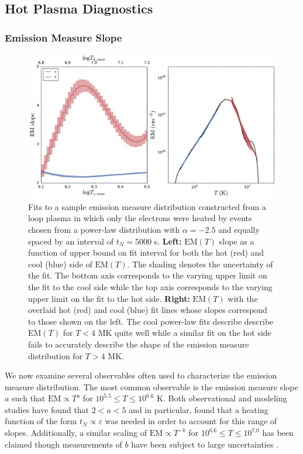 \documentclass[apj]{emulateapj}
\begin{document}
	\subsection{Hot Plasma Diagnostics}
	\label{subsec:diagnostics}
	\subsubsection{Emission Measure Slope}
	\label{subsubsec:em_slope}
	\begin{figure}
		\centering
		\includegraphics[width=2\columnwidth]{figures/em_slope_varying_bounds.pdf}
		\caption{Fits to a sample emission measure distribution constructed from a loop plasma in which only the electrons were heated by events chosen from a power-law distribution with $\alpha=-2.5$ and equally spaced by an interval of $t_N=5000$ s. \textbf{Left:} $\mathrm{EM}(T)$ slope as a function of upper bound on fit interval for both the hot (red) and cool (blue) side of $\mathrm{EM}(T)$. The shading denotes the uncertainty of the fit. The bottom axis corresponds to the varying upper limit on the fit to the cool side while the top axis corresponds to the varying upper limit on the fit to the hot side. \textbf{Right:} $\mathrm{EM}(T)$ with the overlaid hot (red) and cool (blue) fit lines whose slopes correspond to those shown on the left. The cool power-law fits describe describe $\mathrm{EM}(T)$ for $T<4$ MK quite well while a similar fit on the hot side fails to accurately describe the shape of the emission measure distribution for $T>4$ MK.}
		\label{fig:em_slope_varying_bounds}
	\end{figure}
	\par We now examine several observables often used to characterize the emission measure distribution. The most common observable is the emission measure slope $a$ such that $\mathrm{EM}\propto T^a$ for $10^{5.5}\le T\le10^{6.6}$ K. Both observational and modeling studies have found that $2<a<5$ \citep[see Table 3 of][]{bradshaw_diagnosing_2012} and in particular, \citet{cargill_active_2014} found that a heating function of the form $t_N\propto\varepsilon$ was needed in order to account for this range of slopes. Additionally, a similar scaling of $\mathrm{EM}\propto T^{-b}$ for $10^{6.6}\le T\le10^{7.0}$ has been claimed though measurements of $b$ have been subject to large uncertainties \citep{warren_systematic_2012}.
\end{document}
